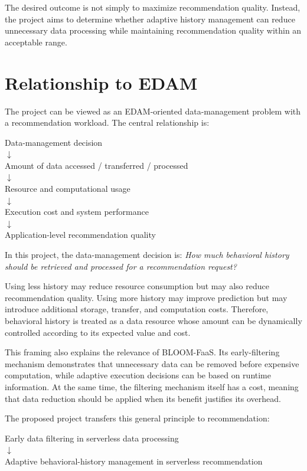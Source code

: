 \documentclass[12pt,a4paper]{article}
\begin{document}
The desired outcome is not simply to maximize recommendation quality. Instead, the project aims to determine whether adaptive history management can reduce unnecessary data processing while maintaining recommendation quality within an acceptable range.

\section{Relationship to EDAM}

The project can be viewed as an EDAM-oriented data-management problem with a recommendation workload. The central relationship is:

\begin{center}
Data-management decision \\
$\downarrow$ \\
Amount of data accessed / transferred / processed \\
$\downarrow$ \\
Resource and computational usage \\
$\downarrow$ \\
Execution cost and system performance \\
$\downarrow$ \\
Application-level recommendation quality
\end{center}

In this project, the data-management decision is: \textit{How much behavioral history should be retrieved and processed for a recommendation request?}

Using less history may reduce resource consumption but may also reduce recommendation quality. Using more history may improve prediction but may introduce additional storage, transfer, and computation costs. Therefore, behavioral history is treated as a data resource whose amount can be dynamically controlled according to its expected value and cost.

This framing also explains the relevance of BLOOM-FaaS. Its early-filtering mechanism demonstrates that unnecessary data can be removed before expensive computation, while adaptive execution decisions can be based on runtime information. At the same time, the filtering mechanism itself has a cost, meaning that data reduction should be applied when its benefit justifies its overhead.

The proposed project transfers this general principle to recommendation:
\begin{center}
Early data filtering in serverless data processing \\
$\downarrow$ \\
Adaptive behavioral-history management in serverless recommendation
\end{center}
\end{document}
